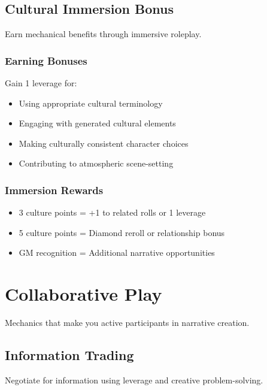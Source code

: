 \subsection{Cultural Immersion Bonus}

Earn mechanical benefits through immersive roleplay.

\subsubsection{Earning Bonuses}

Gain 1 leverage for:
\begin{itemize}
\item Using appropriate cultural terminology
\item Engaging with generated cultural elements
\item Making culturally consistent character choices
\item Contributing to atmospheric scene-setting
\end{itemize}

\subsubsection{Immersion Rewards}

\begin{itemize}
\item 3 culture points = +1 to related rolls or 1 leverage
\item 5 culture points = Diamond reroll or relationship bonus
\item GM recognition = Additional narrative opportunities
\end{itemize}

\section{Collaborative Play}

Mechanics that make you active participants in narrative creation.

\subsection{Information Trading}

Negotiate for information using leverage and creative problem-solving.

